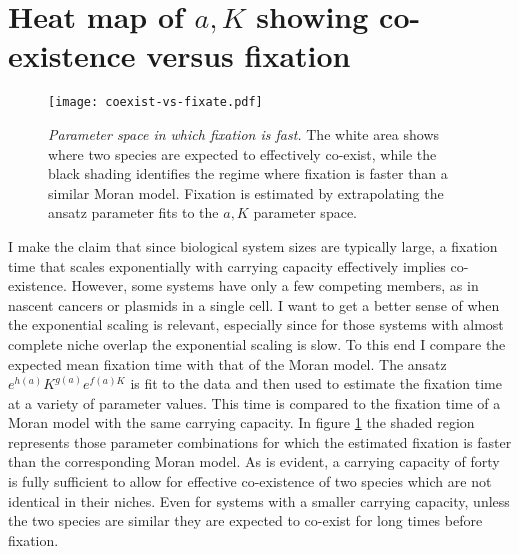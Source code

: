 


\section{Heat map of $a,K$ showing co-existence versus fixation}
\begin{figure}[ht]
	\centering
	\texttt{[image: coexist-vs-fixate.pdf]}
	\caption{\emph{Parameter space in which fixation is fast.} The white area shows where two species are expected to effectively co-exist, while the black shading identifies the regime where fixation is faster than a similar Moran model. Fixation is estimated by extrapolating the ansatz parameter fits to the $a,K$ parameter space. }
	\label{coexistvsfixate}
\end{figure}

I make the claim that since biological system sizes are typically large, a fixation time that scales exponentially with carrying capacity effectively implies co-existence. 
However, some systems have only a few competing members, as in nascent cancers or plasmids in a single cell. 
I want to get a better sense of when the exponential scaling is relevant, especially since for those systems with almost complete niche overlap the exponential scaling is slow. 
To this end I compare the expected mean fixation time with that of the Moran model. 
The ansatz $e^{h(a)}K^{g(a)}e^{f(a)K}$ is fit to the data and then used to estimate the fixation time at a variety of parameter values. 
This time is compared to the fixation time of a Moran model with the same carrying capacity. 
In figure \ref{coexistvsfixate} the shaded region represents those parameter combinations for which the estimated fixation is faster than the corresponding Moran model. 
As is evident, a carrying capacity of forty is fully sufficient to allow for effective co-existence of two species which are not identical in their niches. 
Even for systems with a smaller carrying capacity, unless the two species are similar they are expected to co-exist for long times before fixation. 


